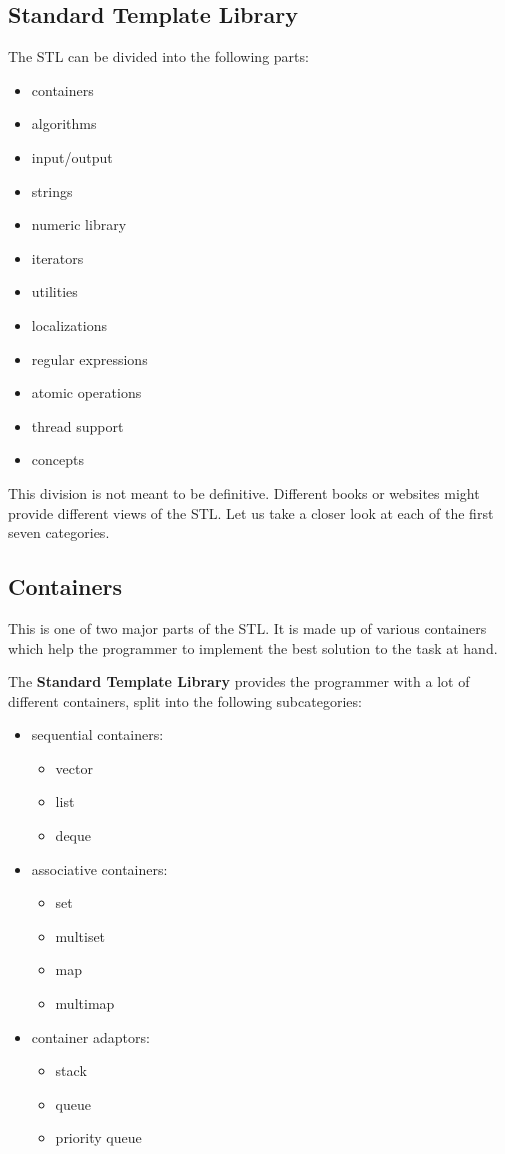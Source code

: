 \subsection{Standard Template Library} %

The STL can be divided into the following parts:
\begin{itemize}
    \item containers
    \item algorithms
    \item input/output
    \item strings
    \item numeric library
    \item iterators
    \item utilities
    \item localizations
    \item regular expressions
    \item atomic operations
    \item thread support
    \item concepts
\end{itemize}

This division is not meant to be definitive. Different books or websites might provide different 
views of the STL. Let us take a closer look at each of the first seven categories.

\subsection{Containers} %
This is one of two major parts of the STL. It is made up of various containers which help the 
programmer to implement the best solution to the task at hand.

The \textbf{Standard Template Library} provides the programmer with a lot of different containers, 
split into the following subcategories:
\begin{itemize}
    \item sequential containers:
    \begin{itemize}
        \item vector
        \item list
        \item deque
    \end{itemize}    
    \item associative containers:
    \begin{itemize}
        \item set
        \item multiset
        \item map
        \item multimap
    \end{itemize}
    \item container adaptors:
    \begin{itemize}
        \item stack
        \item queue
        \item priority queue
    \end{itemize}
\end{itemize}

